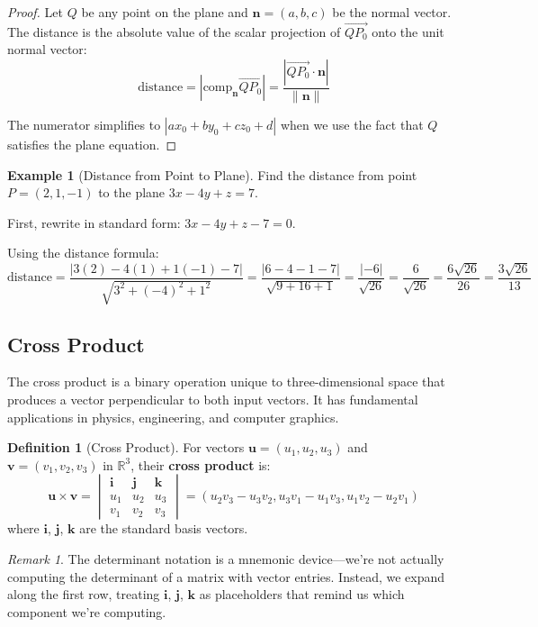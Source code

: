 \documentclass[12pt]{article}
\numberwithin{equation}{section}
\newcommand{\vect}[1]{\boldsymbol{#1}}   %
\theoremstyle{plain}
\theoremstyle{definition}
\newtheorem{definition}[theorem]{Definition}
\newtheorem{example}[theorem]{Example}
\theoremstyle{remark}
\newtheorem{remark}[theorem]{Remark}
\begin{document}
\begin{proof}
Let $Q$ be any point on the plane and $\vect{n} = (a, b, c)$ be the normal vector. The distance is the absolute value of the scalar projection of $\overrightarrow{QP_0}$ onto the unit normal vector:
$$\text{distance} = \left|\text{comp}_{\vect{n}}\overrightarrow{QP_0}\right| = \frac{|\overrightarrow{QP_0} \cdot \vect{n}|}{\|\vect{n}\|}$$

The numerator simplifies to $|ax_0 + by_0 + cz_0 + d|$ when we use the fact that $Q$ satisfies the plane equation.
\end{proof}

\begin{example}[Distance from Point to Plane]
Find the distance from point $P = (2, 1, -1)$ to the plane $3x - 4y + z = 7$.

First, rewrite in standard form: $3x - 4y + z - 7 = 0$.

Using the distance formula:
$$\text{distance} = \frac{|3(2) - 4(1) + 1(-1) - 7|}{\sqrt{3^2 + (-4)^2 + 1^2}} = \frac{|6 - 4 - 1 - 7|}{\sqrt{9 + 16 + 1}} = \frac{|-6|}{\sqrt{26}} = \frac{6}{\sqrt{26}} = \frac{6\sqrt{26}}{26} = \frac{3\sqrt{26}}{13}$$
\end{example}

\subsection{Cross Product}

The cross product is a binary operation unique to three-dimensional space that produces a vector perpendicular to both input vectors. It has fundamental applications in physics, engineering, and computer graphics.

\begin{definition}[Cross Product]
For vectors $\vect{u} = (u_1, u_2, u_3)$ and $\vect{v} = (v_1, v_2, v_3)$ in $\mathbb{R}^3$, their \textbf{cross product} is:
$$\vect{u} \times \vect{v} = \begin{vmatrix} \vect{i} & \vect{j} & \vect{k} \\ u_1 & u_2 & u_3 \\ v_1 & v_2 & v_3 \end{vmatrix} = (u_2v_3 - u_3v_2, u_3v_1 - u_1v_3, u_1v_2 - u_2v_1)$$
where $\vect{i}$, $\vect{j}$, $\vect{k}$ are the standard basis vectors.
\end{definition}

\begin{remark}
The determinant notation is a mnemonic device—we're not actually computing the determinant of a matrix with vector entries. Instead, we expand along the first row, treating $\vect{i}$, $\vect{j}$, $\vect{k}$ as placeholders that remind us which component we're computing.
\end{remark}
\end{document}
